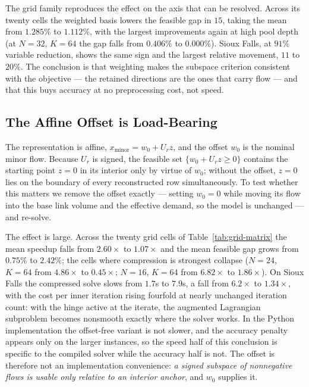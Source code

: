 \documentclass[11pt]{article}
\begin{document}
The grid family reproduces the effect on the axis that can be resolved. Across its twenty cells
the weighted basis lowers the feasible gap in $15$, taking the mean from $1.285\%$ to
$1.112\%$, with the largest improvements again at high pool depth (at $N=32$, $K=64$ the gap
falls from $0.406\%$ to $0.000\%$). Sioux Falls, at $91\%$ variable reduction, shows the same
sign and the largest relative movement, $11$ to $20\%$. The conclusion is that weighting makes
the subspace criterion consistent with the objective --- the retained directions are the ones
that carry flow --- and that this buys accuracy at no preprocessing cost, not speed.

\subsection{The Affine Offset is Load-Bearing}
\label{sec:offset-study}


The representation is affine, $x_{\text{minor}}=w_0+U_rz$, and the offset $w_0$ is the
nominal minor flow. Because $U_r$ is signed, the feasible set $\{w_0+U_rz\ge0\}$ contains the
starting point $z=0$ in its interior only by virtue of $w_0$; without the offset, $z=0$ lies
on the boundary of every reconstructed row simultaneously. To test whether this matters we
remove the offset exactly --- setting $w_0=0$ while moving its flow into the base link volume
and the effective demand, so the model is unchanged --- and re-solve.

The effect is large. Across the twenty grid cells of Table~\ref{tab:grid-matrix} the mean
speedup falls from $2.60\times$ to $1.07\times$ and the mean feasible gap grows from $0.75\%$
to $2.42\%$; the cells where compression is strongest collapse ($N=24$, $K=64$ from
$4.86\times$ to $0.45\times$; $N=16$, $K=64$ from $6.82\times$ to $1.86\times$). On Sioux
Falls the compressed solve slows from $1.7$s to $7.9$s, a fall from $6.2\times$ to
$1.34\times$, with the cost per inner iteration rising fourfold at nearly unchanged iteration
count: with the hinge active at the iterate, the augmented Lagrangian subproblem becomes
nonsmooth exactly where the solver works. In the Python implementation the offset-free
variant is not slower, and the accuracy penalty appears only on the larger instances, so the
speed half of this conclusion is specific to the compiled solver while the accuracy half is
not. The offset is therefore not an implementation convenience: \emph{a signed subspace of
nonnegative flows is usable only relative to an interior anchor}, and $w_0$ supplies it.
\end{document}
